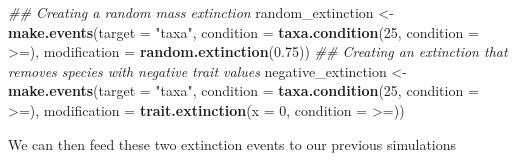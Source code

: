 \documentclass[
]{book}
\newenvironment{Shaded}{\begin{snugshade}}{\end{snugshade}}
\newcommand{\CommentTok}[1]{\textcolor[rgb]{0.56,0.35,0.01}{\textit{#1}}}
\newcommand{\DataTypeTok}[1]{\textcolor[rgb]{0.13,0.29,0.53}{#1}}
\newcommand{\DecValTok}[1]{\textcolor[rgb]{0.00,0.00,0.81}{#1}}
\newcommand{\FloatTok}[1]{\textcolor[rgb]{0.00,0.00,0.81}{#1}}
\newcommand{\KeywordTok}[1]{\textcolor[rgb]{0.13,0.29,0.53}{\textbf{#1}}}
\newcommand{\NormalTok}[1]{#1}
\newcommand{\StringTok}[1]{\textcolor[rgb]{0.31,0.60,0.02}{#1}}
\begin{document}
\begin{Shaded}
\begin{Highlighting}[]
\CommentTok{\#\# Creating a random mass extinction}
\NormalTok{random\_extinction \textless{}{-}}\StringTok{ }\KeywordTok{make.events}\NormalTok{(}\DataTypeTok{target =} \StringTok{"taxa"}\NormalTok{,}
                                 \DataTypeTok{condition =} \KeywordTok{taxa.condition}\NormalTok{(}\DecValTok{25}\NormalTok{, }\DataTypeTok{condition =} \StringTok{\textasciigrave{}}\DataTypeTok{\textgreater{}=}\StringTok{\textasciigrave{}}\NormalTok{),}
                                 \DataTypeTok{modification =} \KeywordTok{random.extinction}\NormalTok{(}\FloatTok{0.75}\NormalTok{))}
\CommentTok{\#\# Creating an extinction that removes species with negative trait values}
\NormalTok{negative\_extinction \textless{}{-}}\StringTok{ }\KeywordTok{make.events}\NormalTok{(}\DataTypeTok{target =} \StringTok{"taxa"}\NormalTok{,}
                                   \DataTypeTok{condition =} \KeywordTok{taxa.condition}\NormalTok{(}\DecValTok{25}\NormalTok{, }\DataTypeTok{condition =} \StringTok{\textasciigrave{}}\DataTypeTok{\textgreater{}=}\StringTok{\textasciigrave{}}\NormalTok{),}
                                   \DataTypeTok{modification =} \KeywordTok{trait.extinction}\NormalTok{(}\DataTypeTok{x =} \DecValTok{0}\NormalTok{, }\DataTypeTok{condition =} \StringTok{\textasciigrave{}}\DataTypeTok{\textgreater{}=}\StringTok{\textasciigrave{}}\NormalTok{))}
\end{Highlighting}
\end{Shaded}

We can then feed these two extinction events to our previous simulations
\end{document}
